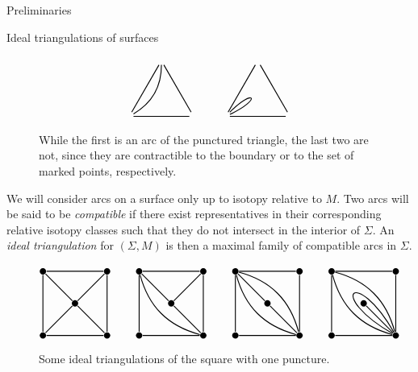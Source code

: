 \begin{chapter}{Preliminaries}
\begin{section}{Ideal triangulations of surfaces}
\begin{figure}[h]
\[\begin{tikzpicture}[thick]
\node (se2) at (3,0) {};
\node (sw2) at (5,0) {}
	edge (se2);
\node (n2) at (4,1.73) {}
	edge (se2)
	edge (sw2)
	edge [bend left] (se2);
\node (c2) at (4,0.7) {};

\node (se3) at (6,0) {}
	edge [in=25, out=45, distance=1.1cm] (se3);
\node (sw3) at (8,0) {}
	edge (se3);
\node (n3) at (7,1.73) {}
	edge (se3)
	edge (sw3);
\node (c3) at (7,0.7) {};
\end{tikzpicture}
\]
\caption{While the first is an arc of the punctured triangle, the last two are not, since they are contractible to the boundary or to the set of marked points, respectively.}
\end{figure}

We will consider arcs on a surface only up to isotopy relative to $M$. Two arcs will be said to be \emph{compatible} if there exist representatives in their corresponding relative isotopy classes such that they do not intersect in the interior of $\Sigma$. An \emph{ideal triangulation} for $(\Sigma, M)$ is then a maximal family of compatible arcs in $\Sigma$.

\begin{figure}[h]
\[
\begin{tikzpicture}[thick]
\label{square-triangs}
\tikzstyle{every node} = [circle, fill=black, minimum size=.2cm, inner sep=0cm]
\node (sw1) at (0,0) {};
\node (nw1) at (0,2) {}
	edge (sw1);
\node (se1) at (2,0) {}
	edge (sw1);
\node (ne1) at (2,2) {}
	edge (nw1)
	edge (se1);
\node (c1) at (1,1) {}
	edge (sw1)
	edge (nw1)
	edge (se1)
	edge (ne1);

\node (sw2) at (3,0) {};
\node (nw2) at (3,2) {}
	edge (sw2);
\node (se2) at (5,0) {}
	edge (sw2)
	edge [bend left] (nw2);
\node (ne2) at (5,2) {}
	edge (nw2)
	edge (se2);
\node (c2) at (4,1) {}
	edge (nw2)
	edge (se2)
	edge (ne2);

\node (sw3) at (6,0) {};
\node (nw3) at (6,2) {}
	edge (sw3);
\node (se3) at (8,0) {}
	edge (sw3)
	edge [bend left] (nw3)
	edge [bend right] (nw3);
\node (ne3) at (8,2) {}
	edge (nw3)
	edge (se3);
\node (c3) at (7,1) {}
	edge (nw3)
	edge (se3);

\node (sw4) at (9,0) {};
\node (nw4) at (9,2) {}
	edge (sw4);
\node (se4) at (11,0) {}
	edge (sw4)
	edge [bend left] (nw4)
	edge [bend right] (nw4)
	edge [in=150, out=120,distance=2.4cm] (se4);
\node (ne4) at (11,2) {}
	edge (nw4)
	edge (se4);
\node (c4) at (10,1) {}
	edge (se4);
\end{tikzpicture}
\]
\caption{Some ideal triangulations of the square with one puncture.}
\end{figure}
\marginpar{\textcolor{red}{las figuras no quedan bien ubicadas}}


\end{section}
\end{chapter}
